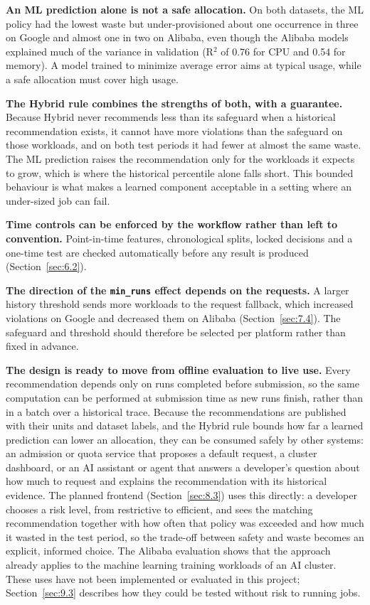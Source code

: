 \textbf{An ML prediction alone is not a safe allocation.} On both datasets, the ML policy had the lowest waste but under-provisioned about one occurrence in three on Google and almost one in two on Alibaba, even though the Alibaba models explained much of the variance in validation (R$^{2}$ of 0.76 for CPU and 0.54 for memory). A model trained to minimize average error aims at typical usage, while a safe allocation must cover high usage.

\textbf{The Hybrid rule combines the strengths of both, with a guarantee.} Because Hybrid never recommends less than its safeguard when a historical recommendation exists, it cannot have more violations than the safeguard on those workloads, and on both test periods it had fewer at almost the same waste. The ML prediction raises the recommendation only for the workloads it expects to grow, which is where the historical percentile alone falls short. This bounded behaviour is what makes a learned component acceptable in a setting where an under-sized job can fail.

\textbf{Time controls can be enforced by the workflow rather than left to convention.} Point-in-time features, chronological splits, locked decisions and a one-time test are checked automatically before any result is produced (Section~\ref{sec:6.2}).

\textbf{The direction of the \texttt{min\_runs} effect depends on the requests.} A larger history threshold sends more workloads to the request fallback, which increased violations on Google and decreased them on Alibaba (Section~\ref{sec:7.4}). The safeguard and threshold should therefore be selected per platform rather than fixed in advance.

\textbf{The design is ready to move from offline evaluation to live use.} Every recommendation depends only on runs completed before submission, so the same computation can be performed at submission time as new runs finish, rather than in a batch over a historical trace. Because the recommendations are published with their units and dataset labels, and the Hybrid rule bounds how far a learned prediction can lower an allocation, they can be consumed safely by other systems: an admission or quota service that proposes a default request, a cluster dashboard, or an AI assistant or agent that answers a developer's question about how much to request and explains the recommendation with its historical evidence. The planned frontend (Section~\ref{sec:8.3}) uses this directly: a developer chooses a risk level, from restrictive to efficient, and sees the matching recommendation together with how often that policy was exceeded and how much it wasted in the test period, so the trade-off between safety and waste becomes an explicit, informed choice. The Alibaba evaluation shows that the approach already applies to the machine learning training workloads of an AI cluster. These uses have not been implemented or evaluated in this project; Section~\ref{sec:9.3} describes how they could be tested without risk to running jobs.

